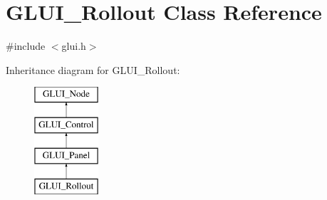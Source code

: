 \hypertarget{classGLUI__Rollout}{\section{G\-L\-U\-I\-\_\-\-Rollout Class Reference}
\label{classGLUI__Rollout}
}


{\ttfamily \#include $<$glui.\-h$>$}

Inheritance diagram for G\-L\-U\-I\-\_\-\-Rollout\-:\begin{figure}[H]
\begin{center}
\leavevmode
\includegraphics[height=4.000000cm]{classGLUI__Rollout}
\end{center}
\end{figure}
